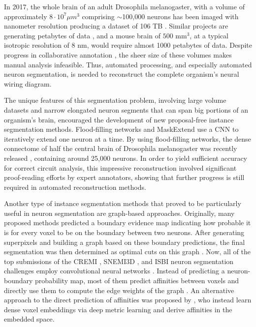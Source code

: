 In 2017, the whole brain of an adult Drosophila melanogaster, with a volume of approximately $8\cdot 10^7 \mu m^3$ comprising $\sim$100,000 neurons has been imaged with nanometer resolution producing a dataset of 106 TB \cite{zheng2018complete}. Similar projects are generating petabytes of data \cite{yin2020petascale}, and a mouse brain of $500$ mm$^3$, at a typical isotropic resolution of 8 nm, would require almost 1000 petabytes of data.
Despite progress in collaborative annotation \cite{kim2014space}, the sheer size of these volumes makes manual analysis infeasible. Thus, automated processing, and especially automated neuron segmentation, is needed to reconstruct the complete organism's neural wiring diagram.

The unique features of this segmentation problem, involving large volume datasets and narrow elongated neuron segments that can span big portions of an organism's brain, encouraged the development of new proposal-free instance segmentation methods.
Flood-filling networks \cite{januszewski2018high} and MaskExtend \cite{meirovitch2016multi} use a CNN to iteratively extend one neuron at a time. By using flood-filling networks, the dense connectome of half the central brain of Drosophila melanogaster was recently released \cite{xu2020connectome}, containing around 25,000 neurons. In order to yield sufficient accuracy for correct circuit analysis, this impressive reconstruction involved significant proof-reading efforts by expert annotators, showing that further progress is still required in automated reconstruction methods.

Another type of instance segmentation methods that proved to be particularly useful in neuron segmentation are graph-based approaches. 
Originally, many proposed methods predicted a boundary evidence map indicating how probable it is for every voxel to be on the boundary between two neurons. After generating superpixels and building a graph based on these boundary predictions, the final segmentation was then determined as optimal cuts on this graph \cite{andres20123d,andres2012globally,beier2017multicut,funke2018large,meirovitch2019cross,turaga2010convolutional}. Now, all of the top submissions of the CREMI \cite{cremi}, SNEMI3D \cite{SNEMI3D}, and ISBI neuron segmentation challenges employ convolutional neural networks \cite{lee2017superhuman,hirsch2020patchperpix,bailoni2019generalized}. Instead of predicting a neuron-boundary probability map, most of them predict affinities between voxels and directly use them to compute the edge weights of the graph \cite{lee2017superhuman,pape2017solving,hirsch2020patchperpix,pape2019leveraging,wolf2018mutex}. An alternative approach to the direct prediction of affinities was proposed by \cite{lee2019learning}, who instead learn dense voxel embeddings via deep metric learning and derive affinities in the embedded space. 

